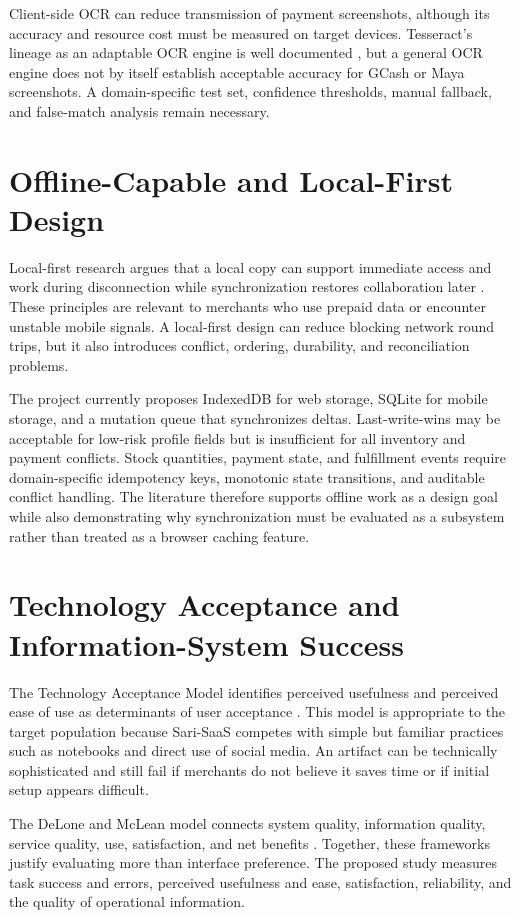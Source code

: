 \documentclass[12pt,oneside]{report}
\begin{document}
Client-side OCR can reduce transmission of payment screenshots, although its
accuracy and resource cost must be measured on target devices. Tesseract's
lineage as an adaptable OCR engine is well documented \parencite{smith2007ocr},
but a general OCR engine does not by itself establish acceptable accuracy for
GCash or Maya screenshots. A domain-specific test set, confidence thresholds,
manual fallback, and false-match analysis remain necessary.

\section{Offline-Capable and Local-First Design}
Local-first research argues that a local copy can support immediate access and
work during disconnection while synchronization restores collaboration later
\parencite{kleppmann2019localfirst}. These principles are relevant to merchants
who use prepaid data or encounter unstable mobile signals. A local-first design
can reduce blocking network round trips, but it also introduces conflict,
ordering, durability, and reconciliation problems.

The project currently proposes IndexedDB for web storage, SQLite for mobile
storage, and a mutation queue that synchronizes deltas. Last-write-wins may be
acceptable for low-risk profile fields but is insufficient for all inventory
and payment conflicts. Stock quantities, payment state, and fulfillment events
require domain-specific idempotency keys, monotonic state transitions, and
auditable conflict handling. The literature therefore supports offline work as
a design goal while also demonstrating why synchronization must be evaluated as
a subsystem rather than treated as a browser caching feature.

\section{Technology Acceptance and Information-System Success}
The Technology Acceptance Model identifies perceived usefulness and perceived
ease of use as determinants of user acceptance \parencite{davis1989tam}. This
model is appropriate to the target population because Sari-SaaS competes with
simple but familiar practices such as notebooks and direct use of social media.
An artifact can be technically sophisticated and still fail if merchants do not
believe it saves time or if initial setup appears difficult.

The DeLone and McLean model connects system quality, information quality,
service quality, use, satisfaction, and net benefits
\parencite{delone2003success}. Together, these frameworks justify evaluating
more than interface preference. The proposed study measures task success and
errors, perceived usefulness and ease, satisfaction, reliability, and the
quality of operational information.
\end{document}
